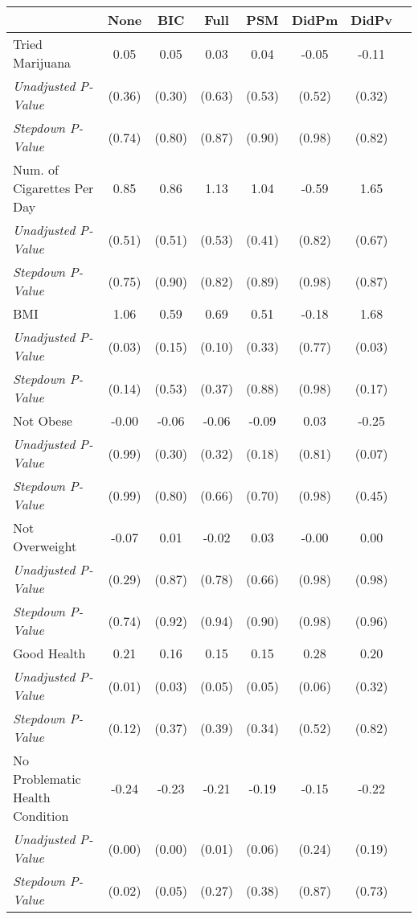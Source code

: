 \begin{tabular}{l c c c c c c c}
\toprule
 & None & BIC & Full & PSM & DidPm & DidPv \\
\midrule
Tried Marijuana & 0.05 & 0.05 & 0.03 & 0.04 & -0.05 & -0.11 \\
\quad \textit{Unadjusted P-Value} & (0.36) & (0.30) & (0.63) & (0.53) & (0.52) & (0.32) \\
\quad \textit{Stepdown P-Value} & (0.74) & (0.80) & (0.87) & (0.90) & (0.98) & (0.82) \\
Num. of Cigarettes Per Day & 0.85 & 0.86 & 1.13 & 1.04 & -0.59 & 1.65 \\
\quad \textit{Unadjusted P-Value} & (0.51) & (0.51) & (0.53) & (0.41) & (0.82) & (0.67) \\
\quad \textit{Stepdown P-Value} & (0.75) & (0.90) & (0.82) & (0.89) & (0.98) & (0.87) \\
BMI & 1.06 & 0.59 & 0.69 & 0.51 & -0.18 & 1.68 \\
\quad \textit{Unadjusted P-Value} & (0.03) & (0.15) & (0.10) & (0.33) & (0.77) & (0.03) \\
\quad \textit{Stepdown P-Value} & (0.14) & (0.53) & (0.37) & (0.88) & (0.98) & (0.17) \\
Not Obese & -0.00 & -0.06 & -0.06 & -0.09 & 0.03 & -0.25 \\
\quad \textit{Unadjusted P-Value} & (0.99) & (0.30) & (0.32) & (0.18) & (0.81) & (0.07) \\
\quad \textit{Stepdown P-Value} & (0.99) & (0.80) & (0.66) & (0.70) & (0.98) & (0.45) \\
Not Overweight & -0.07 & 0.01 & -0.02 & 0.03 & -0.00 & 0.00 \\
\quad \textit{Unadjusted P-Value} & (0.29) & (0.87) & (0.78) & (0.66) & (0.98) & (0.98) \\
\quad \textit{Stepdown P-Value} & (0.74) & (0.92) & (0.94) & (0.90) & (0.98) & (0.96) \\
Good Health & 0.21 & 0.16 & 0.15 & 0.15 & 0.28 & 0.20 \\
\quad \textit{Unadjusted P-Value} & (0.01) & (0.03) & (0.05) & (0.05) & (0.06) & (0.32) \\
\quad \textit{Stepdown P-Value} & (0.12) & (0.37) & (0.39) & (0.34) & (0.52) & (0.82) \\
No Problematic Health Condition & -0.24 & -0.23 & -0.21 & -0.19 & -0.15 & -0.22 \\
\quad \textit{Unadjusted P-Value} & (0.00) & (0.00) & (0.01) & (0.06) & (0.24) & (0.19) \\
\quad \textit{Stepdown P-Value} & (0.02) & (0.05) & (0.27) & (0.38) & (0.87) & (0.73) \\

\end{tabular}
